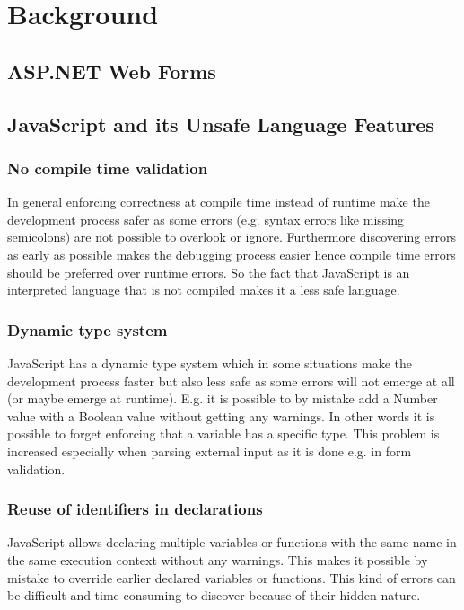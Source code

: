 \chapter{Background}

\section{ASP.NET Web Forms}

\section{JavaScript and its Unsafe Language Features}

		\subsection{No compile time validation}
			In general enforcing correctness at compile time instead of runtime make the development process safer as some errors (e.g. syntax errors like missing semicolons) are not possible to overlook or ignore. Furthermore discovering errors as early as possible makes the debugging process easier hence compile time errors should be preferred over runtime errors. So the fact that JavaScript is an interpreted language that is not compiled makes it a less safe language.

		\subsection{Dynamic type system}
			JavaScript has a dynamic type system which in some situations make the development process faster but also less safe as some errors will not emerge at all (or maybe emerge at runtime). E.g. it is possible to by mistake add a Number value with a Boolean value without getting any warnings. In other words it is possible to forget enforcing that a variable has a specific type. This problem is increased especially when parsing external input as it is done e.g. in form validation.
		
		\subsection{Reuse of identifiers in declarations}
			JavaScript allows declaring multiple variables or functions with the same name in the same execution context without any warnings. This makes it possible by mistake to override earlier declared variables or functions. This kind of errors can be difficult and time consuming to discover because of their hidden nature.

